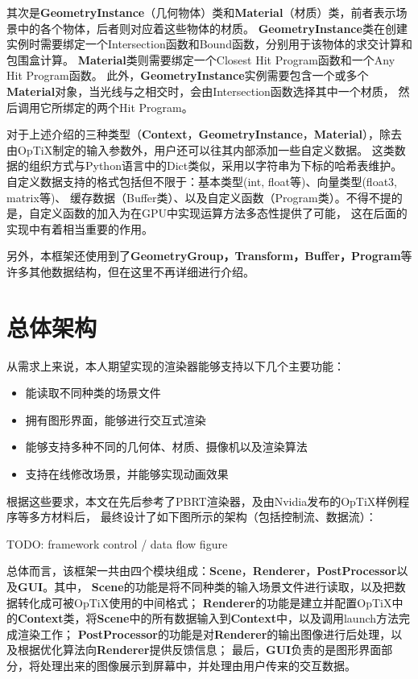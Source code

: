 \label{GeometryInstance}
其次是\textbf{GeometryInstance}（几何物体）类和\textbf{Material}（材质）类，前者表示场景中的各个物体，后者则对应着这些物体的材质。
\textbf{GeometryInstance}类在创建实例时需要绑定一个Intersection函数和Bound函数，分别用于该物体的求交计算和包围盒计算。
\textbf{Material}类则需要绑定一个Closest Hit Program函数和一个Any Hit Program函数。
此外，\textbf{GeometryInstance}实例需要包含一个或多个\textbf{Material}对象，当光线与之相交时，会由Intersection函数选择其中一个材质，
然后调用它所绑定的两个Hit Program。

对于上述介绍的三种类型（\textbf{Context}，\textbf{GeometryInstance}，\textbf{Material}），除去由OpTiX制定的输入参数外，用户还可以往其内部添加一些自定义数据。
这类数据的组织方式与Python语言中的Dict类似，采用以字符串为下标的哈希表维护。
自定义数据支持的格式包括但不限于：基本类型(int, float等)、向量类型(float3, matrix等)、
缓存数据（Buffer类）、以及自定义函数（Program类）。不得不提的是，自定义函数的加入为在GPU中实现运算方法多态性提供了可能，
这在后面的实现中有着相当重要的作用。

另外，本框架还使用到了\textbf{GeometryGroup，Transform，Buffer，Program}等许多其他数据结构，但在这里不再详细进行介绍。

\section{总体架构}
 
从需求上来说，本人期望实现的渲染器能够支持以下几个主要功能：

\begin{itemize}
    \item{能读取不同种类的场景文件}
    \item{拥有图形界面，能够进行交互式渲染}
    \item{能够支持多种不同的几何体、材质、摄像机以及渲染算法}
    \item{支持在线修改场景，并能够实现动画效果}
\end{itemize}

根据这些要求，本文在先后参考了PBRT\cite{PBRT}渲染器，及由Nvidia发布的OpTiX样例程序等多方材料后，
最终设计了如下图所示的架构（包括控制流、数据流）：

TODO: framework control / data flow figure

总体而言，该框架一共由四个模块组成：\textbf{\textbf{Scene}}，\textbf{Renderer}，\textbf{PostProcessor}以及\textbf{GUI}。其中，
\textbf{\textbf{Scene}}的功能是将不同种类的输入场景文件进行读取，以及把数据转化成可被OpTiX使用的中间格式；
\textbf{Renderer}的功能是建立并配置OpTiX中的\textbf{Context}类，将\textbf{\textbf{Scene}}中的所有数据输入到\textbf{Context}中，以及调用launch方法完成渲染工作；
\textbf{PostProcessor}的功能是对\textbf{Renderer}的输出图像进行后处理，以及根据优化算法向\textbf{Renderer}提供反馈信息；
最后，\textbf{GUI}负责的是图形界面部分，将处理出来的图像展示到屏幕中，并处理由用户传来的交互数据。


